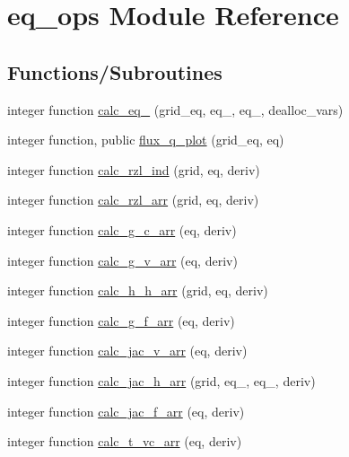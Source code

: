\hypertarget{namespaceeq__ops}{}\section{eq\+\_\+ops Module Reference}
\label{namespaceeq__ops}
\subsection*{Functions/\+Subroutines}
\begin{DoxyCompactItemize}
\item 
integer function \hyperlink{namespaceeq__ops_a91256e08dadab2ccbabd66cf369c43a5}{calc\+\_\+eq\+\_} (grid\+\_\+eq, eq\+\_, eq\+\_, dealloc\+\_\+vars)
\item 
integer function, public \hyperlink{namespaceeq__ops_af0effe20188d46a44680c2648e4572e9}{flux\+\_\+q\+\_\+plot} (grid\+\_\+eq, eq)
\item 
integer function \hyperlink{namespaceeq__ops_a42524ab0697a7a986e2f86c4c75cdc33}{calc\+\_\+rzl\+\_\+ind} (grid, eq, deriv)
\item 
integer function \hyperlink{namespaceeq__ops_a366f4cef2390a357f73e73ca56a57497}{calc\+\_\+rzl\+\_\+arr} (grid, eq, deriv)
\item 
integer function \hyperlink{namespaceeq__ops_a7f4a16387d43c37a1dfa78eb4f91d4e4}{calc\+\_\+g\+\_\+c\+\_\+arr} (eq, deriv)
\item 
integer function \hyperlink{namespaceeq__ops_acf8e40b36693a2c3cc778a85ef66bc32}{calc\+\_\+g\+\_\+v\+\_\+arr} (eq, deriv)
\item 
integer function \hyperlink{namespaceeq__ops_a2874986e80f079d585725b46a327b9e8}{calc\+\_\+h\+\_\+h\+\_\+arr} (grid, eq, deriv)
\item 
integer function \hyperlink{namespaceeq__ops_a29e2bd79210505601bdb37566a503e2a}{calc\+\_\+g\+\_\+f\+\_\+arr} (eq, deriv)
\item 
integer function \hyperlink{namespaceeq__ops_a1a5caa4fb90d75a3f19aba94f98417e0}{calc\+\_\+jac\+\_\+v\+\_\+arr} (eq, deriv)
\item 
integer function \hyperlink{namespaceeq__ops_a0b0e2f58fe1133e16ff604499fa24d29}{calc\+\_\+jac\+\_\+h\+\_\+arr} (grid, eq\+\_, eq\+\_, deriv)
\item 
integer function \hyperlink{namespaceeq__ops_a7d429e0ee6deefac854d3398955dc73d}{calc\+\_\+jac\+\_\+f\+\_\+arr} (eq, deriv)
\item 
integer function \hyperlink{namespaceeq__ops_acd0be2e627748f6387bb38ee0ad7c906}{calc\+\_\+t\+\_\+vc\+\_\+arr} (eq, deriv)

\end{DoxyCompactItemize}
